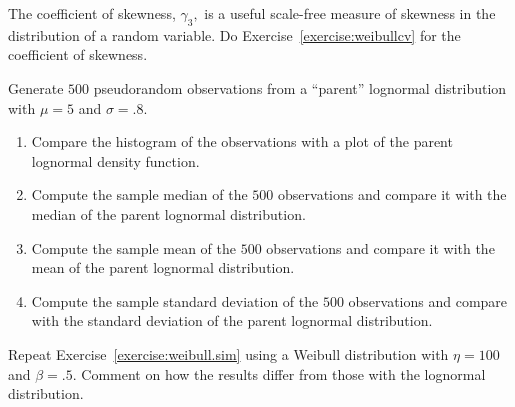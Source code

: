 \begin{exercise}
The coefficient of skewness, $\gamma_{3},$ is a useful scale-free
measure of skewness in the distribution of a random variable. Do
Exercise~\ref{exercise:weibullcv} for the coefficient of skewness.
\end{exercise}

\begin{exercise}
\label{exercise:weibull.sim}
Generate $500$ pseudorandom observations from a ``parent'' lognormal
distribution with $\mu=5$ and $\sigma=.8$.
\begin{enumerate}
\item
Compare the histogram of the observations with a plot of the
parent lognormal density function.
\item
Compute the sample median of the $500$ observations and compare it with
the median of the parent lognormal distribution.
\item
Compute the sample mean of the $500$ observations and compare it with
the mean of the parent lognormal distribution.
\item
Compute the sample standard deviation of the $500$ observations and
compare with the standard deviation of the parent lognormal distribution.
\end{enumerate}
\end{exercise}

\begin{exercise}
Repeat Exercise~\ref{exercise:weibull.sim} using a Weibull
distribution with $\eta=100$ and $\beta=.5.$  Comment on how the results
differ from those with the lognormal distribution.
\end{exercise}


